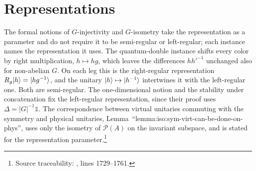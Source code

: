 \documentclass{article}
\begin{document}
\section{Representations}
The formal notions of $G$-injectivity and $G$-isometry take the
representation as a parameter and do not require it to be semi-regular
or left-regular; each instance names the representation it uses. The
quantum-double instance shifts every color by right multiplication,
$h\mapsto hg$, which leaves the differences $hh'^{-1}$ unchanged also for
non-abelian $G$. On each leg this is the right-regular representation
$R_g|h\rangle=|hg^{-1}\rangle$, and the unitary $|h\rangle\mapsto|h^{-1}\rangle$ intertwines it with the left-regular
one. Both are semi-regular. The one-dimensional notion and the stability
under concatenation fix the left-regular representation, since their
proof uses $\Delta=|G|^{-1}\mathbb 1$. The correspondence between
virtual unitaries commuting with the symmetry and physical unitaries,
Lemma~``lemma:iso:sym-virt-can-be-done-on-phys'', uses only the isometry
of $\mathcal P(A)$ on the invariant subspace, and is stated for the
representation parameter.\footnote{Source traceability:
    , lines 1729--1761.}
\end{document}
